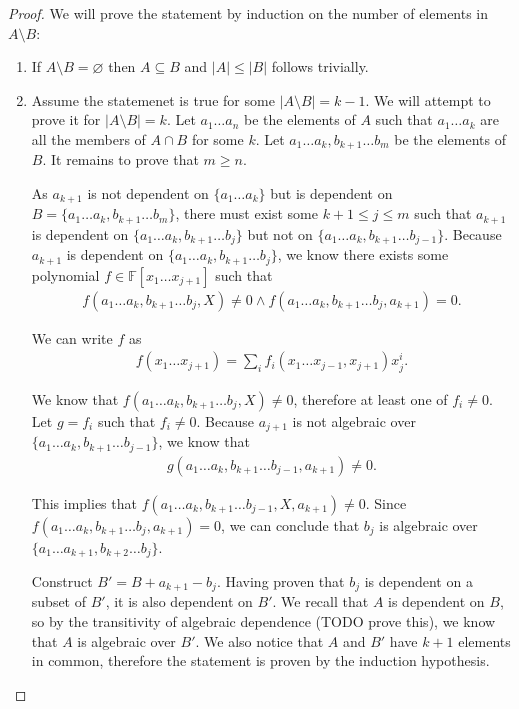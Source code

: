   \begin{proof}
    We will prove the statement by induction on the number of elements in $A \setminus B$:
    \begin{enumerate}
      \item If $A \setminus B = \varnothing $ then $A \subseteq B$ and $|A| \leq |B|$ follows trivially.
      \item Assume the statemenet is true for some $|A \setminus B| = k - 1$. We will attempt to prove it for $|A \setminus B| = k$. Let $a _1 \ldots a _n$ be the elements of $A$ such that $a _1 \ldots a_k$ are all the members of $A \cap B$ for some $k$. Let $ a _1 \ldots a_k, b _{k + 1} \ldots b _m$ be the elements of $B$. It remains to prove that $m \geq n$.

        As $a _{k + 1}$ is not dependent on $\{a _1 \ldots a_k\}$ but is dependent on $B = \{a _1 \ldots a _k, b _{k + 1} \ldots b_m\}$, there must exist some $k + 1 \leq j \leq m$ such that $a _{k + 1}$ is dependent on $\{a _1 \ldots a _k, b _{k + 1} \ldots b_j\}$ but  not on $\{a _1 \ldots a _k, b _{k + 1} \ldots b _{j - 1}\}$. Because $a _{k + 1}$ is dependent on $\{a _1 \ldots a _k, b _{k + 1} \ldots b_j\}$, we know there exists some polynomial $f \in \mathbb F[x _1 \ldots x _{j + 1}]$ such that 
        \begin{align*}
           f(a _1 \ldots a _{k}, b _{k + 1} \ldots b _{j}, X) \neq  0 \land 
           f(a _1 \ldots a _{k}, b _{k + 1} \ldots b _{j}, a _{k + 1})  = 0.
        \end{align*}

      We can write $f$ as
      \begin{align*}
        f(x _1 \ldots x _{j + 1}) 
        = \sum_i f _i(x _1 \ldots x _{j - 1}, x _{j + 1}) x _j ^i.
      \end{align*}

        We know that $f(a _1 \ldots a _{k}, b _{k + 1} \ldots b _{j}, X) \neq  0$, therefore at least one of $f _i \neq 0$. Let $g = f _i $ such that $f _i \neq 0$. Because $a _{j + 1}$ is not algebraic over $\{a _1 \ldots a _k, b _{k + 1} \ldots b _{j - 1}\}$, we know that 
        \begin{align*}
          g(a _1 \ldots a _k, b _{k + 1} \ldots b _{j - 1}, a _{k + 1}) \neq 0.
        \end{align*}

        This implies that $f(a _1 \ldots a _k, b _{k + 1} \ldots b _{j - 1}, X, a _{k + 1}) \neq 0$. Since $ f(a _1 \ldots a _{k}, b _{k + 1} \ldots b _{j}, a _{k + 1})  = 0$, we can conclude that $b_j$ is algebraic over $\{a _1 \ldots a _{k + 1}, b _{k + 2} \ldots b _j\}$.

        Construct $B' = B + a _{k + 1} - b_j$. Having proven that $b_j$ is dependent on a subset of $B'$, it is also dependent on $B'$. We recall that $A$ is dependent on $B$, so by the transitivity of algebraic dependence (TODO prove this), we know that $A$ is algebraic over $B'$. We also notice that $A$ and $B'$ have $k + 1$ elements in common, therefore the statement is proven by the induction hypothesis.
    \end{enumerate}
  \end{proof}

